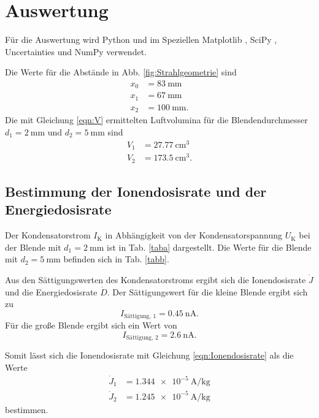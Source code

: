 \section{Auswertung}
\label{sec:Auswertung}

Für die Auswertung wird Python und im Speziellen
Matplotlib \cite{matplotlib}, SciPy \cite{scipy},
Uncertainties \cite{uncertainties} und NumPy \cite{numpy} verwendet.

\noindent Die Werte für die Abstände in Abb. \ref{fig:Strahlgeometrie} sind
\begin{align*}
    x_0 &= \SI{83}{\milli\meter} \\
    x_1 &= \SI{67}{\milli\meter} \\
    x_2 &= \SI{100}{\milli\meter}.
\end{align*}
Die mit Gleichung \eqref{eqn:V} ermittelten Luftvolumina
für die Blendendurchmesser $d_1 = \SI{2}{\milli\meter}$ und
$d_2 = \SI{5}{\milli\meter}$ sind
\begin{align*}
    V_1 &= \SI{27.77}{\centi\meter\cubed} \\ 
    V_2 &= \SI{173.5}{\centi\meter\cubed}.  
\end{align*}


\subsection{Bestimmung der Ionendosisrate und der Energiedosisrate}

Der Kondensatorstrom $I_\text{K}$ in Abhängigkeit von der
Kondensatorspannung $U_\text{K}$ bei der Blende mit
$d_1 = \SI{2}{\milli\meter}$ ist in Tab. \ref{taba}
dargestellt. Die Werte für die Blende mit 
$d_2 = \SI{5}{\milli\meter}$ befinden sich in Tab. \ref{tabb}.




\noindent Aus den Sättigungswerten des Kondensatorstroms ergibt sich die Ionendosisrate $\dot{J}$ und die Energiedosisrate $\dot{D}$. 
Der Sättigungswert für die kleine Blende ergibt sich zu 
\begin{equation*}
    I_\text{Sättigung, 1} = \SI{0.45}{\nano\ampere}.
\end{equation*}
Für die große Blende ergibt sich ein Wert von 
\begin{equation*}
    I_\text{Sättigung, 2} = \SI{2.6}{\nano\ampere}.
\end{equation*}

\noindent Somit lässt sich die Ionendosisrate mit Gleichung \eqref{eqn:Ionendosisrate} als die Werte  
\begin{align*}
    \dot{J}_\text{1} &= \SI{1.344e-5}{\ampere\per\kilo\gram}\\
    \dot{J}_\text{2} &= \SI{1.245e-5}{\ampere\per\kilo\gram} 
\end{align*}
bestimmen.

